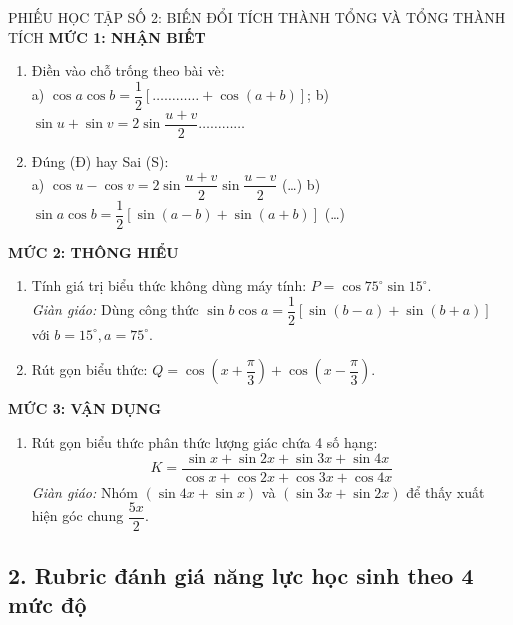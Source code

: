 \documentclass[12pt, a4paper]{article}
\begin{document}
\begin{pedabox}{PHIẾU HỌC TẬP SỐ 2: BIẾN ĐỔI TÍCH THÀNH TỔNG VÀ TỔNG THÀNH TÍCH}
\textbf{MỨC 1: NHẬN BIẾT}
\begin{enumerate}[leftmargin=0.5cm]
    \item Điền vào chỗ trống theo bài vè:\\
    a) $\cos a \cos b = \dfrac{1}{2}[\dots\dots\dots\dots + \cos(a + b)]$; \quad b) $\sin u + \sin v = 2\sin\dfrac{u+v}{2}\dots\dots\dots\dots$
    \item Đúng (Đ) hay Sai (S):\\
    a) $\cos u - \cos v = 2\sin\dfrac{u+v}{2}\sin\dfrac{u-v}{2}$ (\dots) \quad b) $\sin a \cos b = \dfrac{1}{2}[\sin(a-b) + \sin(a+b)]$ (\dots)
\end{enumerate}

\textbf{MỨC 2: THÔNG HIỂU}
\begin{enumerate}[leftmargin=0.5cm]
    \item Tính giá trị biểu thức không dùng máy tính: $P = \cos 75^\circ \sin 15^\circ$.\\
    \textit{Giàn giáo:} Dùng công thức $\sin b \cos a = \dfrac{1}{2}[\sin(b - a) + \sin(b + a)]$ với $b = 15^\circ, a = 75^\circ$.
    \item Rút gọn biểu thức: $Q = \cos\left(x + \dfrac{\pi}{3}\right) + \cos\left(x - \dfrac{\pi}{3}\right)$.
\end{enumerate}

\textbf{MỨC 3: VẬN DỤNG}
\begin{enumerate}[leftmargin=0.5cm]
    \item Rút gọn biểu thức phân thức lượng giác chứa 4 số hạng:
    $$K = \dfrac{\sin x + \sin 2x + \sin 3x + \sin 4x}{\cos x + \cos 2x + \cos 3x + \cos 4x}$$
    \textit{Giàn giáo:} Nhóm $(\sin 4x + \sin x)$ và $(\sin 3x + \sin 2x)$ để thấy xuất hiện góc chung $\dfrac{5x}{2}$.
\end{enumerate}
\end{pedabox}

\subsection*{2. Rubric đánh giá năng lực học sinh theo 4 mức độ}
\end{document}
